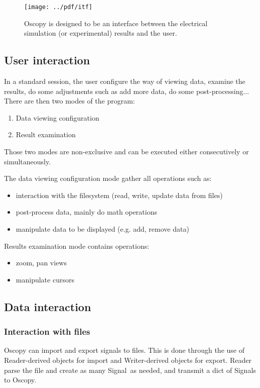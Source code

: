 \documentclass[a4paper,11pt]{article}
\newcommand{\cls}[1]{\textsf{#1}}
\newcommand{\sig}{\cls{Signal}}
\begin{document}
\begin{figure}[htbp]
  \centering
  \texttt{[image: ../pdf/itf]}
  \caption{Oscopy is designed to be an interface between the electrical simulation (or experimental) results and the user.}
  \label{fig:itf}
\end{figure}

\subsection{User interaction}
\label{sec:user}
In a standard session, the user configure the way of viewing data, examine the results, do some adjustments such as add more data, do some post-processing...
There are then two modes of the program:
\begin{enumerate}
\item Data viewing configuration
\item Result examination
\end{enumerate}
Those two modes are non-exclusive and can be executed either consecutively or simultaneously.

The data viewing configuration mode gather all operations such as:
\begin{itemize}
\item interaction with the filesystem (read, write, update data from files)
\item post-process data, mainly do math operations
\item manipulate data to be displayed (e.g. add, remove data)
\end{itemize}
Results examination mode contains operations:
\begin{itemize}
\item zoom, pan views
\item manipulate cursors
\end{itemize}

\subsection{Data interaction}
\label{sec:data}

\subsubsection{Interaction with files}
\label{sec:fileinter}
Oscopy can import and export signals to files.
This is done through the use of Reader-derived objects for import and Writer-derived objects for export.
Reader parse the file and create as many \sig\ as needed, and transmit a dict of \sig s to Oscopy.
\end{document}
